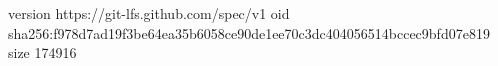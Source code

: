 version https://git-lfs.github.com/spec/v1
oid sha256:f978d7ad19f3be64ea35b6058ce90de1ee70c3dc404056514bccec9bfd07e819
size 174916
